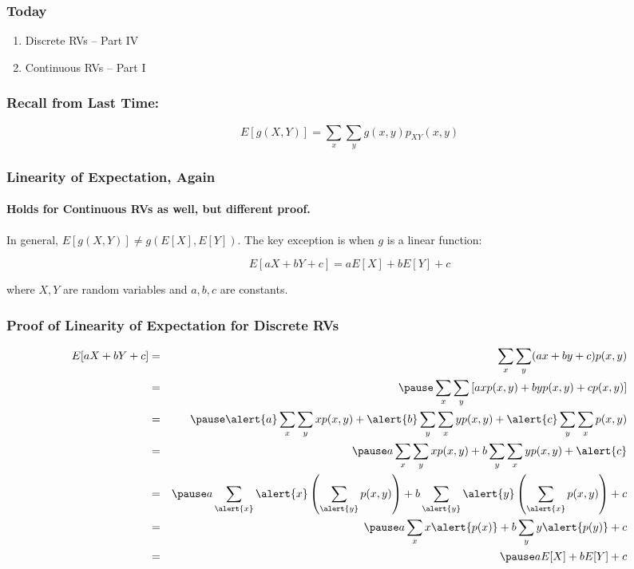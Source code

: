 \documentclass[handout]{beamer}
\date{Lecture \# 11}
\begin{document}
 


\begin{frame}[plain]
	\titlepage 
	

\end{frame} 



\begin{frame}
\frametitle{Today}

\begin{enumerate}
	\item Discrete RVs -- Part IV
	\item Continuous RVs -- Part I
\end{enumerate}

\end{frame}


\begin{frame}
\frametitle{Recall from Last Time:}
\Large
		$$\boxed{E[g(X,Y)] = \sum_x\sum_y g(x,y)p_{XY}(x,y)}$$
\end{frame}


\begin{frame}
\frametitle{Linearity of Expectation, Again}
\framesubtitle{Holds for Continuous RVs as well, but different proof.}
In general, $E[g(X,Y)]\neq g(E[X],E[Y])$. The key exception is when $g$ is a linear function:

\Large
$$\boxed{E[aX + bY + c] = aE[X] + bE[Y] + c}$$

\normalsize
where $X,Y$ are random variables and $a,b,c$ are constants.
\end{frame}
\begin{frame}
\frametitle{Proof of Linearity of Expectation for Discrete RVs}
\footnotesize
\begin{eqnarray*}
	E[aX+bY+c] &=& \sum_x \sum_y (ax+by+c) p(x,y) \\
		&=& \pause \sum_x \sum_y\left[ axp(x,y) + byp(x,y) + cp(x,y)\right]\\
		&=&\pause \alert{a} \sum_x \sum_y xp(x,y) + \alert{b}\sum_y \sum_x y p(x,y) + \alert{c} \sum_y \sum_x  p(x,y) \\
		&=& \pause a \sum_x \sum_y xp(x,y) + b\sum_y \sum_x y p(x,y) + \alert{c}\\
				&=& \pause a \sum_{\alert{x}} \alert{x} \left(\sum_{\alert{y}} p(x,y)\right) + b\sum_{\alert{y}} \alert{y} \left(\sum_{\alert{x}}  p(x,y)\right) + c\\
		&=& \pause a\sum_x x \alert{p(x)} + b\sum_y y  \alert{p(y)}+c\\
		&=& \pause aE[X] + bE[Y] + c
\end{eqnarray*}
\end{frame}
\end{document}
